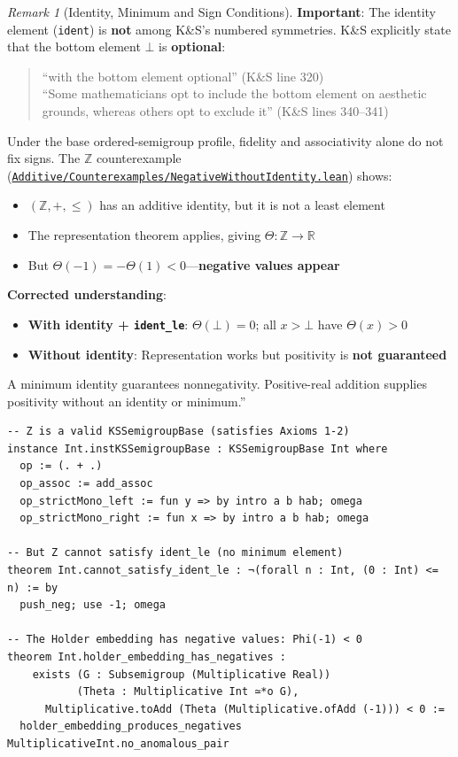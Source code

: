 \documentclass[11pt]{article}
\theoremstyle{definition}
\theoremstyle{remark}
\newtheorem{remark}[theorem]{Remark}
\begin{document}
\begin{remark}[Identity, Minimum and Sign Conditions]
\textbf{Important}: The identity element (\texttt{ident}) is \textbf{not} among K\&S's numbered symmetries.
K\&S explicitly state that the bottom element $\bot$ is \textbf{optional}:
\begin{quote}
``with the bottom element optional'' (K\&S line 320)\\
``Some mathematicians opt to include the bottom element on aesthetic grounds, whereas others opt to exclude it'' (K\&S lines 340--341)
\end{quote}

Under the base ordered-semigroup profile, fidelity and associativity alone do not fix signs.
The $\mathbb{Z}$ counterexample (\href{https://github.com/zariuq/ks-foundations-of-inference/blob/main/KnuthSkilling/Additive/Counterexamples/NegativeWithoutIdentity.lean}{\texttt{Additive/Counterexamples/NegativeWithoutIdentity.lean}}) shows:
\begin{itemize}
\item $(\mathbb{Z}, +, \leq)$ has an additive identity, but it is not a least element
\item The representation theorem applies, giving $\Theta : \mathbb{Z} \to \mathbb{R}$
\item But $\Theta(-1)=-\Theta(1)<0$---\textbf{negative values appear}
\end{itemize}

\textbf{Corrected understanding}:
\begin{itemize}
\item \textbf{With identity + \texttt{ident\_le}}: $\Theta(\bot) = 0$; all $x > \bot$ have $\Theta(x) > 0$
\item \textbf{Without identity}: Representation works but positivity is \textbf{not guaranteed}
\end{itemize}

A minimum identity guarantees nonnegativity. Positive-real addition supplies positivity without an identity or minimum.''

\begin{lstlisting}[caption={$\mathbb{Z}$ counterexample: representation works but positivity fails}]
-- Z is a valid KSSemigroupBase (satisfies Axioms 1-2)
instance Int.instKSSemigroupBase : KSSemigroupBase Int where
  op := (. + .)
  op_assoc := add_assoc
  op_strictMono_left := fun y => by intro a b hab; omega
  op_strictMono_right := fun x => by intro a b hab; omega

-- But Z cannot satisfy ident_le (no minimum element)
theorem Int.cannot_satisfy_ident_le : ¬(forall n : Int, (0 : Int) <= n) := by
  push_neg; use -1; omega

-- The Holder embedding has negative values: Phi(-1) < 0
theorem Int.holder_embedding_has_negatives :
    exists (G : Subsemigroup (Multiplicative Real))
           (Theta : Multiplicative Int ≃*o G),
      Multiplicative.toAdd (Theta (Multiplicative.ofAdd (-1))) < 0 :=
  holder_embedding_produces_negatives MultiplicativeInt.no_anomalous_pair
\end{lstlisting}
\end{remark}
\end{document}
